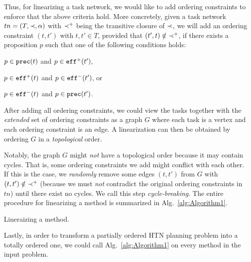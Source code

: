 Thus, for linearizing a task network, we would like to add ordering constraints to enforce that the above criteria hold. More concretely, given a task network $tn = (T, \mathord{\prec}{}, \alpha)$ with $\mathord{\prec}{}^{+}$ being the transitive closure of $\mathord{\prec}{}$, we will add an ordering constraint $(t, t')$ with $t, t' \in T$, provided that $(t' ,t ) \notin \mathord{\prec}{}^{+}$, if there exists a proposition $p$ such that one of the following conditions holds:
\begin{inparaenum}[1)]
    \item $p \in \mathtt{prec}(t)$ and $p \in \mathtt{eff}^{+}(t')$,
    \item $p \in \mathtt{eff}^{+}(t)$ and $p \in \mathtt{eff}^{-}(t')$, or
    \item $p \in \mathtt{eff}^{-}(t)$ and $p \in \mathtt{prec}(t')$. 
\end{inparaenum}
After adding all ordering constraints, we could view the tasks together with the \emph{extended} set of ordering constraints as a graph $G$ where each task is a vertex and each ordering constraint is an edge. A linearization can then be obtained by ordering $G$ in a \emph{topological} order.

Notably, the graph $G$ might \emph{not} have a topological order because it may contain cycles. That is, some ordering constraints we add might conflict with each other. If this is the case, we \emph{randomly} remove some edges $(t, t')$ from $G$ with $(t, t') \notin \mathord{\prec}{}^{+}$ (because we must \emph{not} contradict the original ordering constraints in $tn$) until there exist no cycles. We call this step \emph{cycle-breaking}. The entire procedure for linearizing a method is summarized in Alg.~\ref{alg:Algorithm1}.

\begin{algorithm}[t]
	
	\caption{Lineraizing a method.}
	\label{alg:Algorithm1}
\end{algorithm}

Lastly, in order to transform a partially ordered HTN planning problem into a totally ordered one, we could call Alg.~\ref{alg:Algorithm1} on every method in the input problem.



